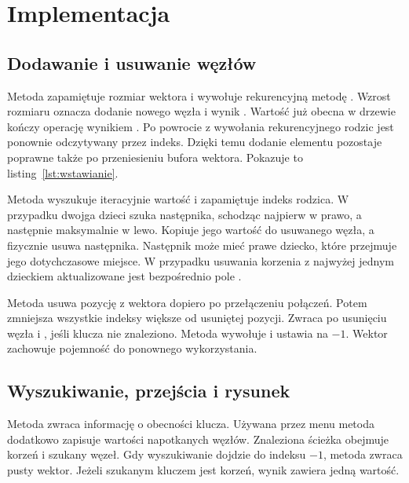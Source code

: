 \clearpage
\section{Implementacja}

\subsection{Dodawanie i usuwanie węzłów}

Metoda  zapamiętuje rozmiar wektora i wywołuje
rekurencyjną metodę . Wzrost rozmiaru oznacza
dodanie nowego węzła i wynik . Wartość już obecna
w drzewie kończy operację wynikiem . Po powrocie
z wywołania rekurencyjnego rodzic jest ponownie odczytywany
przez indeks. Dzięki temu dodanie elementu pozostaje poprawne
także po przeniesieniu bufora wektora. Pokazuje to
listing~\ref{lst:wstawianie}.


Metoda  wyszukuje iteracyjnie wartość i zapamiętuje
indeks rodzica. W przypadku dwojga dzieci szuka następnika, schodząc
najpierw w prawo, a następnie maksymalnie w lewo. Kopiuje jego
wartość do usuwanego węzła, a fizycznie usuwa następnika. Następnik
może mieć prawe dziecko, które przejmuje jego dotychczasowe miejsce.
W przypadku usuwania korzenia z najwyżej jednym dzieckiem
aktualizowane jest bezpośrednio pole .

Metoda usuwa pozycję z wektora dopiero po przełączeniu połączeń.
Potem zmniejsza wszystkie indeksy większe od usuniętej pozycji.
Zwraca  po usunięciu węzła i , jeśli klucza
nie znaleziono. Metoda  wywołuje 
i ustawia  na $-1$. Wektor zachowuje pojemność do
ponownego wykorzystania.

\subsection{Wyszukiwanie, przejścia i rysunek}

Metoda  zwraca informację o obecności klucza.
Używana przez menu metoda  dodatkowo zapisuje
wartości napotkanych węzłów. Znaleziona ścieżka obejmuje korzeń
i szukany węzeł. Gdy wyszukiwanie dojdzie do indeksu $-1$,
metoda zwraca pusty wektor. Jeżeli szukanym kluczem jest korzeń,
wynik zawiera jedną wartość.

